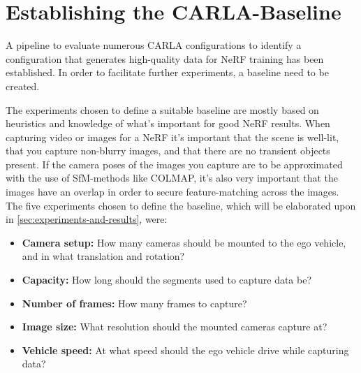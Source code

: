\section{Establishing the CARLA-Baseline}
\begin{comment}
Premise: Have a pipeline to test multiple CARLA-setups
Question: How do I find a CARLA-baseline?

\begin{itemize}
    \item Why do I need a baseline?
    \item How do I find suitable experiments?
    \item How do I evaluate the experiments against each other?
\end{itemize}
\end{comment}

A pipeline to evaluate numerous CARLA configurations to identify a configuration that generates high-quality data for NeRF training has been established. In order to facilitate further experiments, a baseline need to be created.

The experiments chosen to define a suitable baseline are mostly based on heuristics and knowledge of what's important for good NeRF results. When capturing video or images for a NeRF it’s important that the scene is well-lit, that you capture non-blurry images, and that there are no transient objects present. If the camera poses of the images you capture are to be approximated with the use of SfM-methods like COLMAP, it's also very important that the images have an overlap in order to secure feature-matching across the images. The five experiments chosen to define the baseline, which will be elaborated upon in \autoref{sec:experiments-and-results}, were:

\begin{itemize}
    \item \textbf{Camera setup:} How many cameras should be mounted to the ego vehicle, and in what translation and rotation?
    \item \textbf{Capacity:} How long should the segments used to capture data be?
    \item \textbf{Number of frames:} How many frames to capture?
    \item \textbf{Image size:} What resolution should the mounted cameras capture at?
    \item \textbf{Vehicle speed:} At what speed should the ego vehicle drive while capturing data?
\end{itemize}

